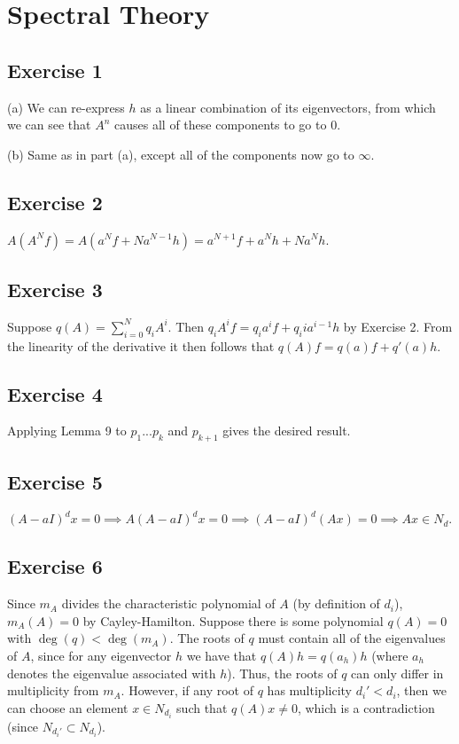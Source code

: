 \section{Spectral Theory}

\subsection{Exercise 1}
(a) We can re-express $h$ as a linear combination of its eigenvectors,
from which we can see that $A^n$ causes all of these components to go to 0.

(b) Same as in part (a), except all of the components now go to $\infty$.

\subsection{Exercise 2}
$A (A^N f) = A(a^N f + Na^{N - 1} h) = a^{N+1} f + a^N h + Na^N h$.

\subsection{Exercise 3}
Suppose $q(A) = \sum_{i = 0}^N q_i A^i$. Then $q_i A^i f = q_i a^i f + q_i i a^{i-1} h$ by
Exercise 2. From the linearity of the derivative it then follows that $q(A) f = q(a) f + q'(a) h$. 

\subsection{Exercise 4}
Applying Lemma 9 to $p_1 ... p_k$ and $p_{k+1}$ gives the desired result.

\subsection{Exercise 5}
$(A - aI)^d x = 0 \implies A (A - aI)^d x = 0 \implies (A - aI)^d (Ax) = 0 \implies Ax \in N_d$.

\subsection{Exercise 6}
Since $m_A$ divides the characteristic polynomial of $A$ (by definition of $d_i$), $m_A (A) = 0$ by Cayley-Hamilton. 
Suppose there is some polynomial $q(A) = 0$ with $\deg(q) < \deg(m_A)$.
The roots of $q$ must contain all of the eigenvalues of $A$, since for any eigenvector $h$ we have that
$q(A)h = q(a_h)h$ (where $a_h$ denotes the eigenvalue associated with $h$). Thus, the roots of $q$ can
only differ in multiplicity from $m_A$. However, if any root of $q$ has multiplicity $d_i' < d_i$, then
we can choose an element $x \in N_{d_i}$ such that $q(A)x \neq 0$, which is a contradiction (since
$N_{d_i'} \subset N_{d_i}$).

